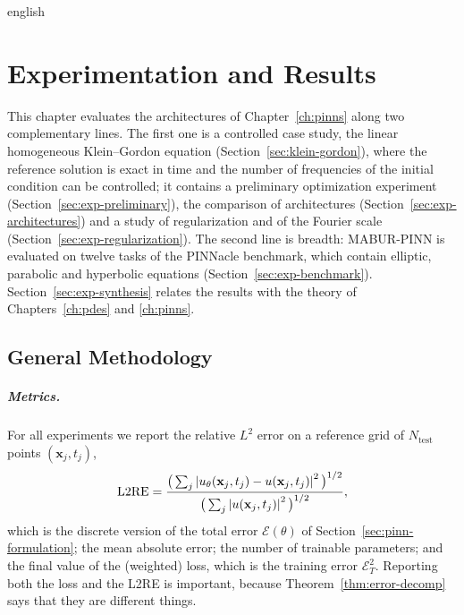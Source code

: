 
\begin{hyphenrules}{english}

\chapter{Experimentation and Results}\label{ch:experiments}

This chapter evaluates the architectures of Chapter~\ref{ch:pinns} along two complementary lines. The first
one is a controlled case study, the linear homogeneous Klein--Gordon equation (Section~\ref{sec:klein-gordon}),
where the reference solution is exact in time and the number of frequencies of the initial condition can
be controlled; it contains a preliminary optimization experiment (Section~\ref{sec:exp-preliminary}), the
comparison of architectures (Section~\ref{sec:exp-architectures}) and a study of regularization and of the
Fourier scale (Section~\ref{sec:exp-regularization}). The second line is breadth: MABUR-PINN is evaluated on
twelve tasks of the PINNacle benchmark, which contain elliptic, parabolic and hyperbolic equations
(Section~\ref{sec:exp-benchmark}). Section~\ref{sec:exp-synthesis} relates the results with the theory of
Chapters~\ref{ch:pdes} and \ref{ch:pinns}.

\section{General Methodology}\label{sec:exp-methodology}

\paragraph{Metrics.}
For all experiments we report the relative $L^2$ error on a reference grid of
$N_{\mathrm{test}}$ points $(\mathbf{x}_j,t_j)$,
\begin{equation}
  \mathrm{L2RE}=\frac{\big(\sum_j\left\lvert u_\theta(\mathbf{x}_j,t_j)-u(\mathbf{x}_j,t_j) \right\rvert^2\big)^{1/2}}{\big(\sum_j\left\lvert u(\mathbf{x}_j,t_j) \right\rvert^2\big)^{1/2}},
  \label{eq:l2re}
\end{equation}
which is the discrete version of the total error $\mathcal{E}(\theta)$ of Section~\ref{sec:pinn-formulation};
the mean absolute error; the number of trainable parameters; and the final value of the (weighted)
loss, which is the training error $\mathcal{E}_T^2$. Reporting both the loss and the L2RE is important,
because Theorem~\ref{thm:error-decomp} says that they are different things.


\end{hyphenrules}
